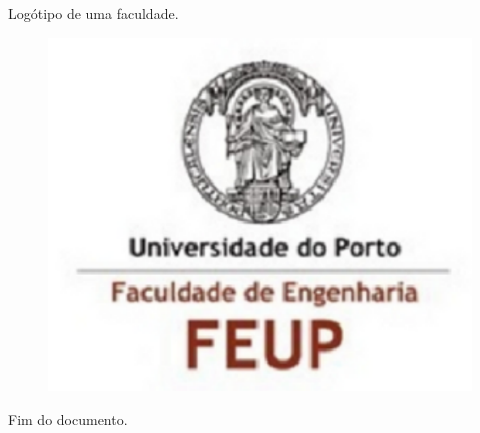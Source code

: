 \documentclass[twoside,a4paper,10pt]{article}
\begin{document}
Logótipo de uma faculdade.
\begin{figure}[!h]
\includegraphics{img.pdf}
\end{figure}

Fim do documento.
\end{document}
